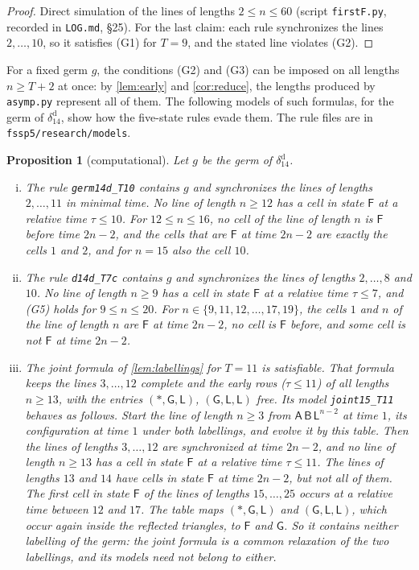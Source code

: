 \documentclass[11pt]{article}
\newtheorem{proposition}[theorem]{Proposition}
\theoremstyle{definition}
\theoremstyle{remark}
\newcommand{\Lq}{\mathsf L}
\newcommand{\Gq}{\mathsf G}
\newcommand{\Aq}{\mathsf A}
\newcommand{\Bq}{\mathsf B}
\newcommand{\Fq}{\mathsf F}
\begin{document}
\begin{proof}
Direct simulation of the lines of lengths $2\le n\le60$ (script
\texttt{firstF.py}, recorded in \texttt{LOG.md}, \S25). For the last claim:
each rule synchronizes the lines $2,\dots,10$, so it satisfies (G1) for $T=9$,
and the stated line violates (G2).
\end{proof}

For a fixed germ $g$, the conditions (G2) and (G3) can be imposed on all
lengths $n\ge T+2$ at once: by \cref{lem:early} and \cref{cor:reduce}, the
lengths produced by \texttt{asymp.py} represent all of them. The following
models of such formulas, for the germ of $\delta_{14}^{\mathrm d}$, show how the
five-state rules evade them. The rule files are in
\texttt{fssp5/research/models}.

\begin{proposition}[computational]\label{prop:germmodels}
Let $g$ be the germ of $\delta_{14}^{\mathrm d}$.
\begin{enumerate}[(i)]
\item The rule \texttt{germ14d\_T10} contains $g$ and synchronizes the lines
of lengths $2,\dots,11$ in minimal time. No line of length $n\ge12$ has a
cell in state $\Fq$ at a relative time $\tau\le10$. For $12\le n\le16$, no cell
of the line of length $n$ is $\Fq$ before time $2n-2$, and the cells that are
$\Fq$ at time $2n-2$ are exactly the cells $1$ and $2$, and for $n=15$ also
the cell $10$.
\item The rule \texttt{d14d\_T7c} contains $g$ and synchronizes the lines of
lengths $2,\dots,8$ and $10$. No line of length $n\ge9$ has a cell in state
$\Fq$ at a relative time $\tau\le7$, and (G5) holds for $9\le n\le20$. For
$n\in\{9,11,12,\dots,17,19\}$, the cells $1$ and $n$ of the line of length $n$
are $\Fq$ at time $2n-2$, no cell is $\Fq$ before, and some cell is not $\Fq$
at time $2n-2$.
\item The joint formula of \cref{lem:labellings} for $T=11$ is satisfiable.
That formula keeps the lines $3,\dots,12$ complete and the early rows
($\tau\le11$) of all lengths $n\ge13$, with the entries $(\ast,\Gq,\Lq)$,
$(\Gq,\Lq,\Lq)$ free. Its model \texttt{joint15\_T11} behaves as follows.
Start the line of length $n\ge3$ from $\Aq\,\Bq\,\Lq^{n-2}$ at time $1$, its
configuration at time $1$ under both labellings, and evolve it by this table.
Then the lines of lengths $3,\dots,12$ are synchronized at time $2n-2$, and no
line of length $n\ge13$ has a cell in state $\Fq$ at a relative time
$\tau\le11$. The lines of lengths $13$ and $14$ have cells in state $\Fq$ at
time $2n-2$, but not all of them. The first cell in state $\Fq$ of the lines
of lengths $15,\dots,25$ occurs at a relative time between $12$ and $17$.
The table maps $(\ast,\Gq,\Lq)$ and $(\Gq,\Lq,\Lq)$, which occur again inside
the reflected triangles, to $\Fq$ and $\Gq$. So it contains neither labelling
of the germ: the joint formula is a common relaxation of the two labellings,
and its models need not belong to either.
\end{enumerate}
\end{proposition}
\end{document}
